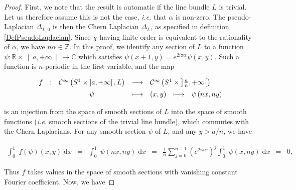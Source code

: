 \documentclass{jams-l}
\theoremstyle{definition}
\theoremstyle{remark}
\numberwithin{equation}{section}
\begin{document}
        \begin{proof}
        
            First, we note that the result is automatic if the line bundle $L$ is trivial. Let us therefore assume this is not the case, \textit{i.e.} that $\alpha$ is non-zero. The pseudo-Laplacian $\Delta_{L,0}$ is then the Chern Laplacian $\Delta_L$, as specified in definition \ref{DefPseudoLaplacian}. Since $\chi$ having finite order is equivalent to the rationality of $\alpha$, we have $n \alpha \in \mathbb{Z}$. In this proof, we identify any section of $L$ to a function $\psi : \mathbb{R} \times \left] a, + \infty \right[ \longrightarrow \mathbb{C}$ which satisfies $\psi \left( x+1, y \right) = e^{2 i \pi \alpha} \psi \left( x, y \right)$. Such a function is $n$-periodic in the first variable, and the map
            
            \[ \begin{array}{cccllll}
                    f & : & \mathcal{C}^{\infty} \left( S^1 \times \left] a, +\infty \right[, L \right) & \longrightarrow & \multicolumn{3}{l}{\mathcal{C}^{\infty} \left( S^1 \times \left] \frac{a}{n}, +\infty \right[ \right)} \\[0.5em]
                    
                    && \psi & \longmapsto & \left( x, y \right) & \longmapsto & \psi \left( nx, ny \right)
                \end{array} \]
            
            \noindent is an injection from the space of smooth sections of $L$ into the space of smooth functions (\textit{i.e.} smooth sections of the trivial line bundle), which commutes with the Chern Laplacians. For any smooth section $\psi$ of $L$, and any $y > a/n$, we have
            
            \[ \begin{array}{lllllll}
                    \scriptstyle \int_0^1 \; f \left( \psi \right) \left( x, y \right) \; \mathrm{d}x & \scriptstyle = & \scriptstyle \int_0^1 \; \psi \left( nx, ny \right) \; \mathrm{d}x & \scriptstyle = & \scriptstyle \frac{1}{n} \sum\limits_{j=0}^{n-1} \left( e^{2i\pi \alpha} \right)^j \int_0^1 \; \psi \left( x, ny \right) \; \mathrm{d}x & \scriptstyle = & \scriptstyle 0,
                \end{array} \]
            
            \noindent Thus $f$ takes values in the space of smooth sections with vanishing constant Fourier coefficient. Now, we have
            

\end{proof}
\end{document}
